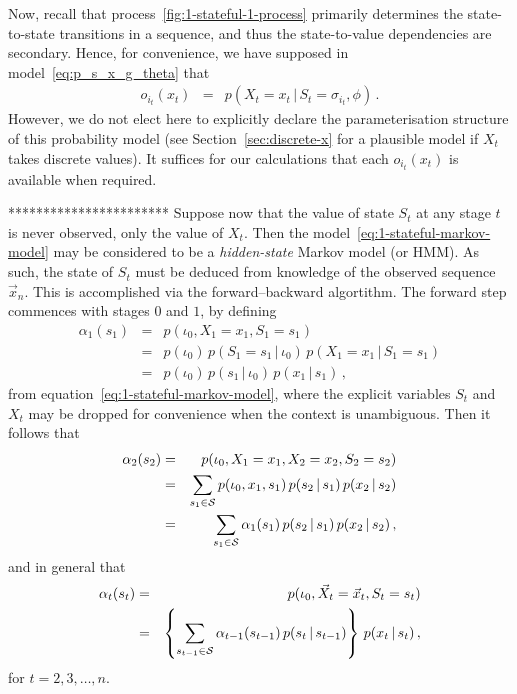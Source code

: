 \documentclass[a4paper]{article}
\begin{document}
Now, recall that process~\ref{fig:1-stateful-1-process} primarily determines the state-to-state transitions in a sequence, and thus
the state-to-value dependencies are secondary. Hence, for convenience, we have supposed in model~\eqref{eq:p_s_x_g_theta} that
\begin{eqnarray}
  o_{i_t}(x_t) & = & p(X_t\!=\!x_t\,|\,S_t\!=\!\sigma_{i_t},\phi)\,.
\end{eqnarray}
However, we do not elect here to explicitly declare the parameterisation structure of this probability model (see Section~\ref{sec:discrete-x} for a plausible model if $X_t$ takes discrete values). 
It suffices for our calculations that each $o_{i_t}(x_t)$ is available when required.

***********************
Suppose now that the value of state $S_t$ at any stage $t$ is never observed, only the value of $X_t$.
Then the model~\eqref{eq:1-stateful-markov-model} may be considered to be a {\em hidden-state} Markov model (or HMM).
As such, the state of $S_t$ must be deduced from knowledge of the observed sequence $\vec{x}_n$. This is accomplished
via the forward--backward algortithm. The forward step commences with stages $0$ and $1$, by defining
\begin{eqnarray}
  \alpha_1(s_1) & = & p(\iota_0,X_1=x_1,S_1=s_1)
\nonumber\\
& = & p(\iota_0)\,p(S_1=s_1\,|\,\iota_0)\,p(X_1=x_1\,|\,S_1=s_1)
\nonumber\\
& = & p(\iota_0)\,p(s_1\,|\,\iota_0)\,p(x_1\,|\,s_1)
\,,
\end{eqnarray}
from equation~\eqref{eq:1-stateful-markov-model}, where the explicit variables $S_t$ and $X_t$ may be
dropped for convenience when the context is unambiguous.
Then it follows that
\begin{eqnarray}
  \alpha_2(s_2) & = & p(\iota_0,X_1=x_1,X_2=x_2,S_2=s_2)
\nonumber\\
& = & \sum_{s_1\in{\cal S}}p(\iota_0,x_1,s_1)\,p(s_2\,|\,s_1)\,p(x_2\,|\,s_2)
\nonumber\\
& = & \sum_{s_1\in{\cal S}}\alpha_1(s_1)\,p(s_2\,|\,s_1)\,p(x_2\,|\,s_2)\,,
\end{eqnarray}
and in general that
\begin{eqnarray}
   \alpha_t(s_t) & = & p(\iota_0,\vec{X}_t=\vec{x}_t,S_t=s_t)
\nonumber\\
& = & \left\{\sum_{s_{t-1}\in{\cal S}}\alpha_{t-1}(s_{t-1})\,p(s_t\,|\,s_{t-1})\right\}\,p(x_t\,|\,s_t)\,,
\end{eqnarray}
for $t=2,3,\ldots,n$.
\end{document}

